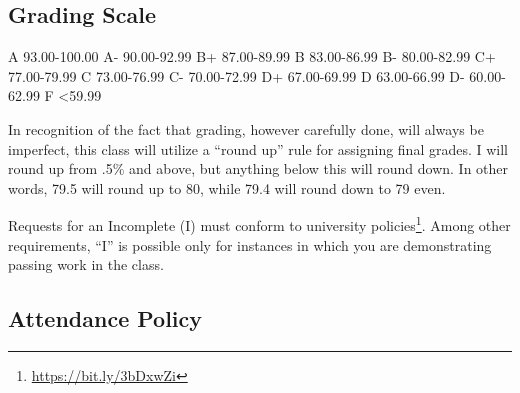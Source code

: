 \documentclass[
  letterpaper,
  DIV=11,
  numbers=noendperiod]{scrartcl}
\DeclareRobustCommand{\href}[2]{#2\footnote{\url{#1}}}
\begin{document}
\hypertarget{grading-scale}{%
\subsection{Grading Scale}\label{grading-scale}}

A 93.00-100.00 \textbar{} A- 90.00-92.99 B+ 87.00-89.99 \textbar{} B
83.00-86.99 \textbar{} B- 80.00-82.99 C+ 77.00-79.99 \textbar{} C
73.00-76.99 \textbar{} C- 70.00-72.99 D+ 67.00-69.99 \textbar{} D
63.00-66.99 \textbar{} D- 60.00-62.99 F \textless59.99

\begin{tcolorbox}[enhanced jigsaw, leftrule=.75mm, breakable, opacityback=0, bottomrule=.15mm, rightrule=.15mm, colbacktitle=quarto-callout-note-color!10!white, colframe=quarto-callout-note-color-frame, arc=.35mm, bottomtitle=1mm, left=2mm, title=\textcolor{quarto-callout-note-color}{\faInfo}\hspace{0.5em}{Note}, titlerule=0mm, toptitle=1mm, toprule=.15mm, opacitybacktitle=0.6, colback=white, coltitle=black]

In recognition of the fact that grading, however carefully done, will
always be imperfect, this class will utilize a ``round up'' rule for
assigning final grades. I will round up from .5\% and above, but
anything below this will round down. In other words, 79.5 will round up
to 80, while 79.4 will round down to 79 even.

\end{tcolorbox}

\begin{tcolorbox}[enhanced jigsaw, leftrule=.75mm, breakable, opacityback=0, bottomrule=.15mm, rightrule=.15mm, colbacktitle=quarto-callout-important-color!10!white, colframe=quarto-callout-important-color-frame, arc=.35mm, bottomtitle=1mm, left=2mm, title=\textcolor{quarto-callout-important-color}{\faExclamation}\hspace{0.5em}{Important}, titlerule=0mm, toptitle=1mm, toprule=.15mm, opacitybacktitle=0.6, colback=white, coltitle=black]

Requests for an Incomplete (I) must conform to
\href{https://bit.ly/3bDxwZi}{university policies}. Among other
requirements, ``I'' is possible only for instances in which you are
demonstrating passing work in the class.

\end{tcolorbox}

\hypertarget{attendance-policy}{%
\subsection{Attendance Policy}\label{attendance-policy}}
\end{document}
